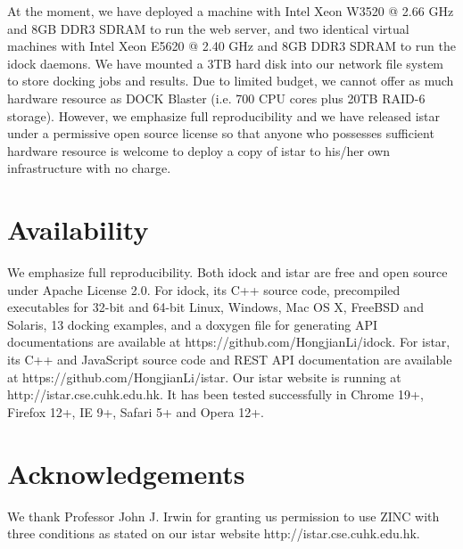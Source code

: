\documentclass[10pt]{article}
\begin{document}
At the moment, we have deployed a machine with Intel Xeon W3520 @ 2.66 GHz and 8GB DDR3 SDRAM to run the web server, and two identical virtual machines with Intel Xeon E5620 @ 2.40 GHz and 8GB DDR3 SDRAM to run the idock daemons. We have mounted a 3TB hard disk into our network file system to store docking jobs and results. Due to limited budget, we cannot offer as much hardware resource as DOCK Blaster (i.e. 700 CPU cores plus 20TB RAID-6 storage). However, we emphasize full reproducibility and we have released istar under a permissive open source license so that anyone who possesses sufficient hardware resource is welcome to deploy a copy of istar to his/her own infrastructure with no charge.

\section*{Availability}
We emphasize full reproducibility. Both idock and istar are free and open source under Apache License 2.0. For idock, its C++ source code, precompiled executables for 32-bit and 64-bit Linux, Windows, Mac OS X, FreeBSD and Solaris, 13 docking examples, and a doxygen file for generating API documentations are available at https://github.com/HongjianLi/idock. For istar, its C++ and JavaScript source code and REST API documentation are available at https://github.com/HongjianLi/istar. Our istar website is running at http://istar.cse.cuhk.edu.hk. It has been tested successfully in Chrome 19+, Firefox 12+, IE 9+, Safari 5+ and Opera 12+.

\section*{Acknowledgements}
We thank Professor John J. Irwin for granting us permission to use ZINC \cite{532,1178} with three conditions as stated on our istar website http://istar.cse.cuhk.edu.hk.
\end{document}
